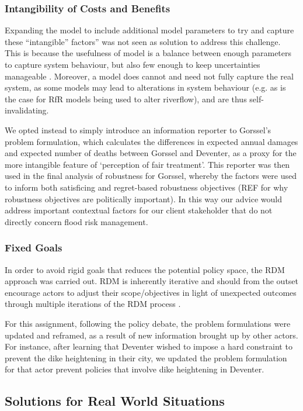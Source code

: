 \subsubsection{Intangibility of Costs and Benefits} Expanding the model to include additional model parameters to try and capture these “intangible” factors” was not seen as solution to address this challenge. This is because the usefulness of model is a balance between enough parameters to capture system behaviour, but also few enough to keep uncertainties manageable \parencite{saltelli_five_2020}. Moreover, a model does cannot and need not fully capture the real system, as some models may lead to alterations in system behaviour (e.g. as is the case for RfR models being used to alter riverflow), and are thus self-invalidating.

We opted instead to simply introduce an information reporter to Gorssel’s problem formulation, which calculates the differences in expected annual damages and expected number of deaths between Gorssel and Deventer, as a proxy for the more intangible feature of ‘perception of fair treatment’. This reporter was then used in the final analysis of robustness for Gorssel, whereby the factors were used to inform both satisficing and regret-based robustness objectives (REF for why robustness objectives are politically important). In this way our advice would address important contextual factors for our client stakeholder that do not directly concern flood risk management. 

\subsubsection{Fixed Goals} In order to avoid rigid goals that reduces the potential policy space, the RDM approach was carried out. RDM is inherently iterative and should from the outset encourage actors to adjust their scope/objectives in light of unexpected outcomes through multiple iterations of the RDM process \parencite{lempert_general_2006}. 

For this assignment, following the policy debate, the problem formulations were updated and reframed, as a result of new information brought up by other actors. For instance, after learning that Deventer wished to impose a hard constraint to prevent the dike heightening in their city, we updated the problem formulation for that actor prevent policies that involve dike heightening in Deventer. 

\subsection{Solutions for Real World Situations }

